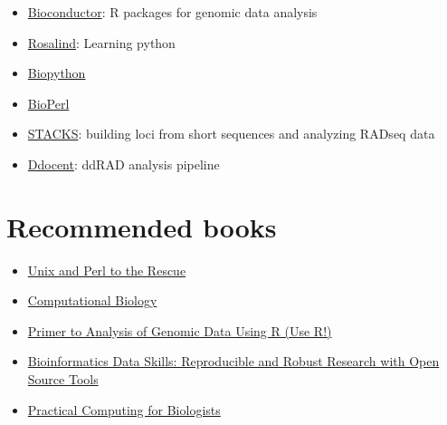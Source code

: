 \documentclass[11pt]{article}
\begin{document}
\begin{itemize}
\item \href{http://www.bioconductor.org/}{Bioconductor}: R packages for genomic data analysis
\end{itemize}


\begin{itemize}
\item \href{http://rosalind.info/problems/locations/}{Rosalind}: Learning python
\end{itemize}


\begin{itemize}
\item \href{http://biopython.org/wiki/Main_Page}{Biopython}
\end{itemize}


\begin{itemize}
\item \href{http://www.bioperl.org/wiki/Main_Page}{BioPerl}
\end{itemize}


\begin{itemize}
\item \href{http://creskolab.uoregon.edu/stacks/}{STACKS}: building loci from short sequences and analyzing RADseq data
\end{itemize}


\begin{itemize}
\item \href{https://ddocent.wordpress.com/ddocent-pipeline-user-guide/}{Ddocent}: ddRAD analysis pipeline
\end{itemize}

\section{Recommended books}
\label{sec-4}
\begin{itemize}
\item \href{http://unixandperl.com/}{Unix and Perl to the Rescue}
\item \href{http://www.staff.hs-mittweida.de/~wuenschi/doku.php?id=rwbook2}{Computational Biology}
\item \href{https://www.amazon.com/Primer-Analysis-Genomic-Data-Using/dp/331914474X/ref=sr_1_1?ie=UTF8&qid=1491488356&sr=8-1&keywords=primer+to+analysis+of+genomic+data+using+r}{Primer to Analysis of Genomic Data Using R (Use R!)}
\item \href{https://www.amazon.com/Bioinformatics-Data-Skills-Reproducible-Research/dp/1449367372/ref=sr_1_1?ie=UTF8&qid=1491488394&sr=8-1&keywords=bioinformatics+data+skills}{Bioinformatics Data Skills: Reproducible and Robust Research with Open Source Tools}
\item \href{https://www.amazon.com/Practical-Computing-Biologists-Steven-Haddock/dp/0878933913/ref=sr_1_8?ie=UTF8&qid=1491813979&sr=8-8&keywords=computational+biology}{Practical Computing for Biologists}
\end{itemize}
\end{document}
